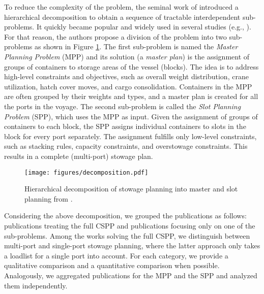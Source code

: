 \documentclass[preprint,12pt,authoryear]{elsarticle}
\begin{document}
To reduce the complexity of the problem, the seminal work of \cite{Wilson2000ContainerSolutions} introduced a hierarchical decomposition to obtain a sequence of tractable interdependent sub-problems. It quickly became popular and widely used in several studies (e.g., \cite{Kaisar2006ATRANSPORTATION, Pacino2018CranePlanning}). For that reason, the authors propose a division of the problem into two sub-problems as shown in Figure \ref{fig:decomposition}. The first sub-problem is named the {\em Master Planning Problem} (MPP) and its solution (a {\em master plan}) is the assignment of groups of containers to storage areas of the vessel (blocks). The idea is to address high-level constraints and objectives, such as overall weight distribution, crane utilization, hatch cover moves, and cargo consolidation. Containers in the MPP are often grouped by their weights and types, and a master plan is created for all the ports in the voyage. The second sub-problem is called the {\em Slot Planning Problem} (SPP), which uses the MPP as input. Given the assignment of groups of containers to each block, the SPP assigns individual containers to slots in the block for every port separately. The assignment fulfills only low-level constraints, such as stacking rules, capacity constraints, and overstowage constraints. This results in a complete (multi-port) stowage plan.

\begin{figure}[!h]
	\centering
		\texttt{[image: figures/decomposition.pdf]} 
	\caption{Hierarchical decomposition of stowage planning into master and slot planning from \cite{Pacino2011FastVessels}.}
	\label{fig:decomposition}
\end{figure}

Considering the above decomposition, we grouped the publications as follows: publications treating the full CSPP and publications focusing only on one of the sub-problems. Among the works solving the full CSPP, we distinguish between multi-port and single-port stowage planning, where the latter approach only takes a loadlist for a single port into account. For each category, we provide a qualitative comparison and a quantitative comparison when possible. Analogously, we aggregated publications for the MPP and the SPP and analyzed them independently.
\end{document}
